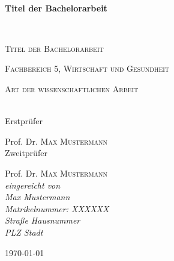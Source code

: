 \begin{titlepage}
		\begin{center}
        \HLine \\[0.4cm] %
        {\huge \bfseries Titel der Bachelorarbeit \par}\vspace{0.4cm} %
        \HLine \\[0.4cm] %
		{\scshape\LARGE Titel der Bachelorarbeit \par}
        {\scshape\normalsize Fachbereich 5, Wirtschaft und Gesundheit \par}
		\vspace{1.5cm}
		{\scshape\Large Art der wissenschaftlichen Arbeit \par}
        
        \textit{} \\        
		Erstprüfer\par
		Prof. Dr.
 \textsc{Max Mustermann} \\[5ex]
 		Zweitprüfer\par
		Prof. Dr.
 \textsc{Max Mustermann} \\[5ex]
		{\normalsize\itshape eingereicht von \\ Max Mustermann
		\\ Matrikelnummer: 	XXXXXX
		\\ Straße Hausnummer
		\\ PLZ Stadt \\} 
		\vfill
{\large \today\par}

		    
\end{center}
\end{titlepage}
\newpage